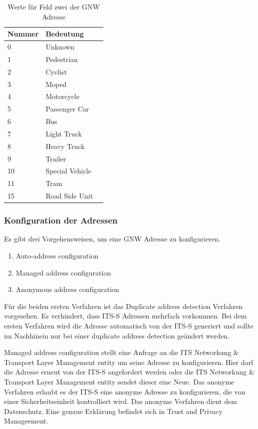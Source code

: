\begin{table}[h]
\begin{tabular}{lll}
\textbf{Nummer} & \textbf{Bedeutung}  \\ \hline
    0 & Unknown \\
    1 & Pedestrian \\
    2 & Cyclist \\
    3 & Moped \\
    4 & Motorcycle \\
    5 & Passenger Car \\
    6 & Bus \\
    7 & Light Truck \\
    8 & Heavy Truck \\
    9 & Trailer \\
    10 & Special Vehicle \\
    11 & Tram \\
    15 & Road Side Unit \\
\end{tabular}
\caption{Werte für Feld zwei der \acs{GNW} Adresse \cite{etsi302636-4-1}}
\label{tab:typenspezi}
\end{table}

\subsubsection{Konfiguration der Adressen}
Es gibt drei Vorgehensweisen, um eine \acl{GNW} Adresse zu konfigurieren.

\begin{enumerate}
      	\item Auto-address configuration
	\item Managed address configuration
	\item Anonymous address configuration
\end{enumerate}

Für die beiden ersten Verfahren ist das Duplicate address detection Verfahren vorgesehen. Es verhindert, dass \ac{ITS-S} Adressen mehrfach vorkommen.
Bei dem ersten Verfahren wird die Adresse automatisch von der \ac{ITS-S} generiert und sollte im Nachhinein nur bei einer duplicate address detection geändert werden. 

Managed address configuration stellt eine Anfrage an die ITS Networkung \& Transport Layer Management entity um seine Adresse zu konfigurieren. Hier darf die Adresse erneut von der \ac{ITS-S} angefordert werden oder die ITS Networkung \& Transport Layer Management entity sendet dieser eine Neue. Das anonyme Verfahren erlaubt es der \ac{ITS-S} eine anonyme Adresse zu konfigurieren, die von einer Sicherheitseinheit kontrolliert wird. Das anonyme Verfahren dient dem Datenschutz. Eine genaue Erklärung befindet sich in Trust and Privacy Manageement. 

